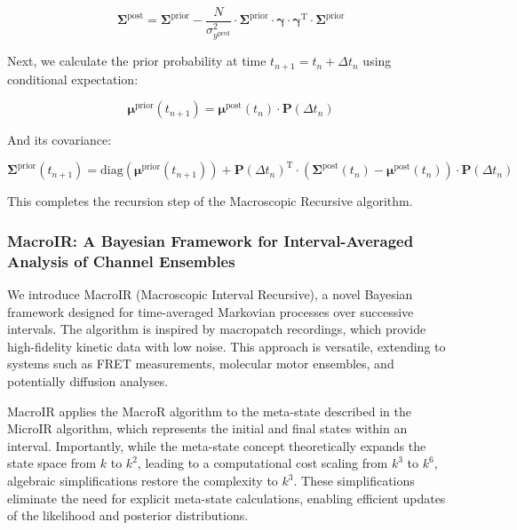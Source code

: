 \documentclass[pdflatex,sn-mathphys-num]{sn-jnl}%
\theoremstyle{thmstyleone}%
\theoremstyle{thmstyletwo}%
\theoremstyle{thmstylethree}%
\begin{document}
\begin{equation}
	\boldsymbol{\Sigma}^{\text{post}} = \boldsymbol{\Sigma}^{\text{prior}} - \frac{N}{\sigma^2_{y^{\text{pred}}}} \cdot \boldsymbol{\Sigma}^{\text{prior}} \cdot \boldsymbol{\gamma} \cdot \boldsymbol{\gamma}^{\mathrm{T}} \cdot \boldsymbol{\Sigma}^{\text{prior}}
	\label{eq:macro_cov_posterior}
\end{equation}

Next, we calculate the prior probability at time \( t_{n+1} = t_n + \Delta t_n \) using conditional expectation:

\begin{equation}
	\boldsymbol{\mu}^{\text{prior}}(t_{n+1}) = \boldsymbol{\mu}^{\text{post}}(t_n) \cdot \mathbf{P}(\Delta t_n)
	\label{eq:macro_mean_next_prior}
\end{equation}

And its covariance:

\begin{equation}
	\boldsymbol{\Sigma}^{\text{prior}}(t_{n+1}) = \mathrm{diag}(\boldsymbol{\mu}^{\text{prior}}(t_{n+1})) + \mathbf{P}(\Delta t_n)^{\mathrm{T}} \cdot \left( \boldsymbol{\Sigma}^{\text{post}}(t_n) - \boldsymbol{\mu}^{\text{post}}(t_n) \right) \cdot \mathbf{P}(\Delta t_n)
	\label{eq:macro_mean_next_cov}
\end{equation}

This completes the recursion step of the Macroscopic Recursive algorithm.


\subsubsection{MacroIR: A Bayesian Framework for Interval-Averaged Analysis of Channel Ensembles}

We introduce MacroIR (Macroscopic Interval Recursive), a novel Bayesian framework designed for time-averaged Markovian processes over successive intervals. The algorithm is inspired by macropatch recordings, which provide high-fidelity kinetic data with low noise. This approach is versatile, extending to systems such as FRET measurements, molecular motor ensembles, and potentially diffusion analyses.

MacroIR applies the MacroR algorithm to the meta-state described in the MicroIR algorithm, which represents the initial and final states within an interval. Importantly, while the meta-state concept theoretically expands the state space from \( k \) to \( k^2 \), leading to a computational cost scaling from \( k^3 \) to \( k^6 \), algebraic simplifications restore the complexity to \( k^3 \). These simplifications eliminate the need for explicit meta-state calculations, enabling efficient updates of the likelihood and posterior distributions.
\end{document}
